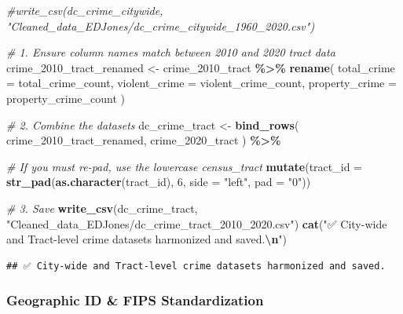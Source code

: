 \documentclass[
]{article}
\newenvironment{Shaded}{\begin{snugshade}}{\end{snugshade}}
\newcommand{\AttributeTok}[1]{\textcolor[rgb]{0.13,0.29,0.53}{#1}}
\newcommand{\CommentTok}[1]{\textcolor[rgb]{0.56,0.35,0.01}{\textit{#1}}}
\newcommand{\DecValTok}[1]{\textcolor[rgb]{0.00,0.00,0.81}{#1}}
\newcommand{\FunctionTok}[1]{\textcolor[rgb]{0.13,0.29,0.53}{\textbf{#1}}}
\newcommand{\NormalTok}[1]{#1}
\newcommand{\OtherTok}[1]{\textcolor[rgb]{0.56,0.35,0.01}{#1}}
\newcommand{\SpecialCharTok}[1]{\textcolor[rgb]{0.81,0.36,0.00}{\textbf{#1}}}
\newcommand{\StringTok}[1]{\textcolor[rgb]{0.31,0.60,0.02}{#1}}
\begin{document}
\begin{Shaded}
\begin{Highlighting}[]
\CommentTok{\#write\_csv(dc\_crime\_citywide, "Cleaned\_data\_EDJones/dc\_crime\_citywide\_1960\_2020.csv")}
\end{Highlighting}
\end{Shaded}

\begin{Shaded}
\begin{Highlighting}[]
\CommentTok{\# 1. Ensure column names match between 2010 and 2020 tract data}
\NormalTok{crime\_2010\_tract\_renamed }\OtherTok{\textless{}{-}}\NormalTok{ crime\_2010\_tract }\SpecialCharTok{\%\textgreater{}\%}
  \FunctionTok{rename}\NormalTok{(}
    \AttributeTok{total\_crime =}\NormalTok{ total\_crime\_count,}
    \AttributeTok{violent\_crime =}\NormalTok{ violent\_crime\_count,}
    \AttributeTok{property\_crime =}\NormalTok{ property\_crime\_count}
\NormalTok{  )}

\CommentTok{\# 2. Combine the datasets}
\NormalTok{dc\_crime\_tract }\OtherTok{\textless{}{-}} \FunctionTok{bind\_rows}\NormalTok{(}
\NormalTok{  crime\_2010\_tract\_renamed,}
\NormalTok{  crime\_2020\_tract}
\NormalTok{) }\SpecialCharTok{\%\textgreater{}\%}

  \CommentTok{\# If you must re{-}pad, use the lowercase \textquotesingle{}census\_tract\textquotesingle{}}
  \FunctionTok{mutate}\NormalTok{(}\AttributeTok{tract\_id =} \FunctionTok{str\_pad}\NormalTok{(}\FunctionTok{as.character}\NormalTok{(tract\_id), }\DecValTok{6}\NormalTok{, }\AttributeTok{side =} \StringTok{"left"}\NormalTok{, }\AttributeTok{pad =} \StringTok{"0"}\NormalTok{))}

\CommentTok{\# 3. Save}
\FunctionTok{write\_csv}\NormalTok{(dc\_crime\_tract, }\StringTok{"Cleaned\_data\_EDJones/dc\_crime\_tract\_2010\_2020.csv"}\NormalTok{)}
\FunctionTok{cat}\NormalTok{(}\StringTok{"✅ City{-}wide and Tract{-}level crime datasets harmonized and saved.}\SpecialCharTok{\textbackslash{}n}\StringTok{"}\NormalTok{)}
\end{Highlighting}
\end{Shaded}

\begin{verbatim}
## ✅ City-wide and Tract-level crime datasets harmonized and saved.
\end{verbatim}

\subsubsection{Geographic ID \& FIPS
Standardization}\label{geographic-id-fips-standardization}
\end{document}
